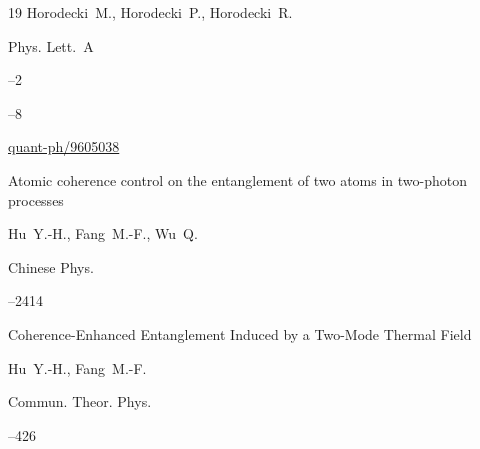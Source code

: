 \begin{thebibliography}{19}
\by    Horodecki~M.,  Horodecki~P.,   Horodecki~R.

\jour Phys. Lett.~A



--2

--8


\arxiv \href{http://arxiv.org/abs/quant-ph/9605038}{quant-ph/9605038}






\paper Atomic coherence control on the entanglement of two atoms in two-photon processes

\by     Hu~Y.-H.,  Fang~M.-F., Wu~Q. 

\jour Chinese Phys.




--2414





\paper Coherence-Enhanced Entanglement Induced by a Two-Mode Thermal Field

\by     Hu~Y.-H.,  Fang~M.-F. 

\jour  Commun. Theor. Phys. 




--426




\end{thebibliography}



\EngDate



\renewcommand{\baselinestretch}{0.9}



\Russian

\newpage



%

